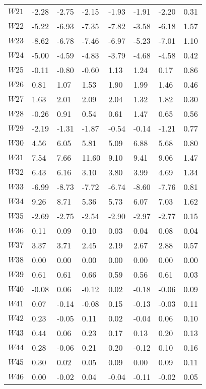 \documentclass{article}
\begin{document}
\begin{longtable}{llllllll}
	$W21$	&	-2.28	&	-2.75	&	-2.15	&	-1.93	&	-1.91	&	-2.20	&	0.31	\\
	$W22$	&	-5.22	&	-6.93	&	-7.35	&	-7.82	&	-3.58	&	-6.18	&	1.57	\\
	$W23$	&	-8.62	&	-6.78	&	-7.46	&	-6.97	&	-5.23	&	-7.01	&	1.10	\\
	$W24$	&	-5.00	&	-4.59	&	-4.83	&	-3.79	&	-4.68	&	-4.58	&	0.42	\\
	$W25$	&	-0.11	&	-0.80	&	-0.60	&	1.13	&	1.24	&	0.17	&	0.86	\\
	$W26$	&	0.81	&	1.07	&	1.53	&	1.90	&	1.99	&	1.46	&	0.46	\\
	$W27$	&	1.63	&	2.01	&	2.09	&	2.04	&	1.32	&	1.82	&	0.30	\\
	$W28$	&	-0.26	&	0.91	&	0.54	&	0.61	&	1.47	&	0.65	&	0.56	\\
	$W29$	&	-2.19	&	-1.31	&	-1.87	&	-0.54	&	-0.14	&	-1.21	&	0.77	\\
	$W30$	&	4.56	&	6.05	&	5.81	&	5.09	&	6.88	&	5.68	&	0.80	\\
	$W31$	&	7.54	&	7.66	&	11.60	&	9.10	&	9.41	&	9.06	&	1.47	\\
	$W32$	&	6.43	&	6.16	&	3.10	&	3.80	&	3.99	&	4.69	&	1.34	\\
	$W33$	&	-6.99	&	-8.73	&	-7.72	&	-6.74	&	-8.60	&	-7.76	&	0.81	\\
	$W34$	&	9.26	&	8.71	&	5.36	&	5.73	&	6.07	&	7.03	&	1.62	\\
	$W35$	&	-2.69	&	-2.75	&	-2.54	&	-2.90	&	-2.97	&	-2.77	&	0.15	\\
	$W36$	&	0.11	&	0.09	&	0.10	&	0.03	&	0.04	&	0.08	&	0.04	\\
	$W37$	&	3.37	&	3.71	&	2.45	&	2.19	&	2.67	&	2.88	&	0.57	\\
	$W38$	&	0.00	&	0.00	&	0.00	&	0.00	&	0.00	&	0.00	&	0.00	\\
	$W39$	&	0.61	&	0.61	&	0.66	&	0.59	&	0.56	&	0.61	&	0.03	\\
	$W40$	&	-0.08	&	0.06	&	-0.12	&	0.02	&	-0.18	&	-0.06	&	0.09	\\
	$W41$	&	0.07	&	-0.14	&	-0.08	&	0.15	&	-0.13	&	-0.03	&	0.11	\\
	$W42$	&	0.23	&	-0.05	&	0.11	&	0.02	&	-0.04	&	0.06	&	0.10	\\
	$W43$	&	0.44	&	0.06	&	0.23	&	0.17	&	0.13	&	0.20	&	0.13	\\
	$W44$	&	0.28	&	-0.06	&	0.21	&	0.20	&	-0.12	&	0.10	&	0.16	\\
	$W45$	&	0.30	&	0.02	&	0.05	&	0.09	&	0.00	&	0.09	&	0.11	\\
	$W46$	&	0.00	&	-0.02	&	0.04	&	-0.04	&	-0.11	&	-0.02	&	0.05	\\

\end{longtable}
\end{document}
